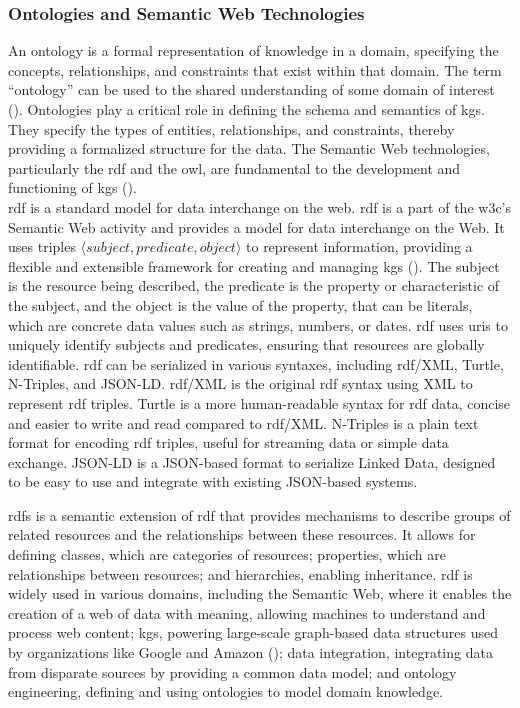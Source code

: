 \subsubsection*{Ontologies and Semantic Web Technologies}
An ontology is a formal representation of knowledge in a domain, specifying the concepts, relationships, and constraints that exist within that domain. The term ``ontology'' can be used to the shared understanding of some domain of interest (\cite{Uschold1996}).
Ontologies play a critical role in defining the schema and semantics of \glspl{kg}. They specify the types of entities, relationships, and constraints, thereby providing a formalized structure for the data. The Semantic Web technologies, particularly the \gls{rdf} and the \gls{owl}, are fundamental to the development and functioning of \glspl{kg} (\cite{Antoniou2008}).
\\\gls{rdf} is a standard model for data interchange on the web.
\gls{rdf} is a part of the \gls{w3c}'s Semantic Web activity and provides a model for data interchange on the Web.
It uses triples $\langle subject,predicate,object \rangle$ to represent information, providing a flexible and extensible framework for creating and managing \glspl{kg} (\cite{Cyganiak14RCA}).
The subject is the resource being described, the predicate is the property or characteristic of the subject, and the object is the value of the property, that can be literals, which are concrete data values such as strings, numbers, or dates.
\gls{rdf} uses \glspl{uri} to uniquely identify subjects and predicates, ensuring that resources are globally identifiable.
\gls{rdf} can be serialized in various syntaxes, including \gls{rdf}/XML, Turtle, N-Triples, and JSON-LD. \gls{rdf}/XML is the original \gls{rdf} syntax using XML to represent \gls{rdf} triples. Turtle is a more human-readable syntax for \gls{rdf} data, concise and easier to write and read compared to \gls{rdf}/XML. N-Triples is a plain text format for encoding \gls{rdf} triples, useful for streaming data or simple data exchange. JSON-LD is a JSON-based format to serialize Linked Data, designed to be easy to use and integrate with existing JSON-based systems.

\gls{rdfs} is a semantic extension of \gls{rdf} that provides mechanisms to describe groups of related resources and the relationships between these resources. It allows for defining classes, which are categories of resources; properties, which are relationships between resources; and hierarchies, enabling inheritance.
\gls{rdf} is widely used in various domains, including the Semantic Web, where it enables the creation of a web of data with meaning, allowing machines to understand and process web content; \glspl{kg}, powering large-scale graph-based data structures used by organizations like Google and Amazon (\cite{Kejriwal2022}); data integration, integrating data from disparate sources by providing a common data model; and ontology engineering, defining and using ontologies to model domain knowledge.

